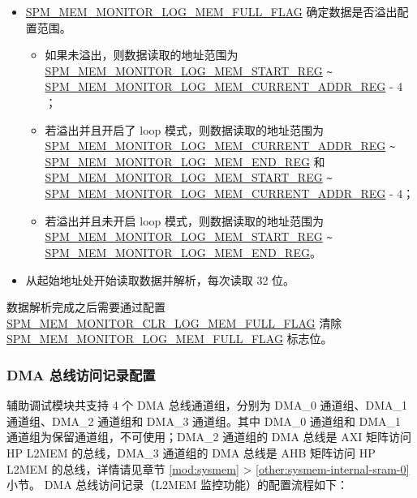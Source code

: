 \documentclass[main\_\_CN.tex]{subfiles}
\begin{document}
\begin{itemize}
    \item \hyperref[fielddesc:SPMMEMMONITORLOGMEMFULLFLAG]{SPM\_MEM\_MONITOR\_LOG\_MEM\_FULL\_FLAG} 确定数据是否溢出配置范围。
    \begin{itemize}
        \item 如果未溢出，则数据读取的地址范围为 \hyperref[regdesc:SPMMEMMONITORLOGMEMSTARTREG]{SPM\_MEM\_MONITOR\_LOG\_MEM\_START\_REG}  \verb+~+ \hyperref[regdesc:SPMMEMMONITORLOGMEMCURRENTADDRREG]{SPM\_MEM\_MONITOR\_LOG\_MEM\_CURRENT\_ADDR\_REG} - 4 ；
        \item 若溢出并且开启了 loop 模式，则数据读取的地址范围为 \hyperref[regdesc:SPMMEMMONITORLOGMEMCURRENTADDRREG]{SPM\_MEM\_MONITOR\_LOG\_MEM\_CURRENT\_ADDR\_REG} \verb+~+ \hyperref[regdesc:SPMMEMMONITORLOGMEMENDREG]{SPM\_MEM\_MONITOR\_LOG\_MEM\_END\_REG} 和 \hyperref[regdesc:SPMMEMMONITORLOGMEMSTARTREG]{SPM\_MEM\_MONITOR\_LOG\_MEM\_START\_REG} \verb+~+ \hyperref[regdesc:SPMMEMMONITORLOGMEMCURRENTADDRREG]{SPM\_MEM\_MONITOR\_LOG\_MEM\_CURRENT\_ADDR\_REG} - 4；
        \item 若溢出并且未开启 loop 模式，则数据读取的地址范围为 \hyperref[regdesc:SPMMEMMONITORLOGMEMSTARTREG]{SPM\_MEM\_MONITOR\_LOG\_MEM\_START\_REG} \verb+~+ \hyperref[regdesc:SPMMEMMONITORLOGMEMENDREG]{SPM\_MEM\_MONITOR\_LOG\_MEM\_END\_REG}。
    \end{itemize}
    \item 从起始地址处开始读取数据并解析，每次读取 32 位。

\end{itemize}

数据解析完成之后需要通过配置 \hyperref[fielddesc:SPMMEMMONITORCLRLOGMEMFULLFLAG]{SPM\_MEM\_MONITOR\_CLR\_LOG\_MEM\_FULL\_FLAG} 清除  \hyperref[fielddesc:SPMMEMMONITORLOGMEMFULLFLAG]{SPM\_MEM\_MONITOR\_LOG\_MEM\_FULL\_FLAG} 标志位。



\subsubsection{DMA 总线访问记录配置}

辅助调试模块共支持 4 个 DMA 总线通道组，分别为 DMA\_0 通道组、DMA\_1 通道组、DMA\_2 通道组和 DMA\_3 通道组。其中 DMA\_0 通道组和 DMA\_1 通道组为保留通道组，不可使用；DMA\_2 通道组的 DMA 总线是 AXI 矩阵访问 HP L2MEM 的总线，DMA\_3 通道组的 DMA 总线是 AHB 矩阵访问 HP L2MEM 的总线，详情请见章节 \ref{mod:sysmem} \textit{} > \ref{other:sysmem-internal-sram-0} 小节。
DMA 总线访问记录（L2MEM 监控功能）的配置流程如下：
\end{document}
